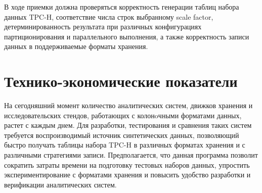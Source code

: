 \documentclass{../TechDoc}
\begin{document}
    В ходе приемки должна проверяться корректность генерации таблиц набора данных TPC-H, соответствие числа строк выбранному scale factor, детерминированность результата при различных конфигурациях партиционирования и параллельного выполнения, а также корректность записи данных в поддерживаемые форматы хранения.
    
    \section{Технико-экономические показатели}
    
     На сегодняшний момент количество аналитических систем, движков хранения и исследовательских стендов, работающих с колонoчными форматами данных, растет с каждым днем. Для разработки, тестирования и сравнения таких систем требуется воспроизводимый источник синтетических данных, позволяющий быстро получать таблицы набора TPC-H в различных форматах хранения и с различными стратегиями записи. Предполагается, что данная программа позволит сократить затраты времени на подготовку тестовых наборов данных, упростить экспериментирование с форматами хранения и повысить удобство разработки и верификации аналитических систем.
        
    \registrationList
        
\end{document}
